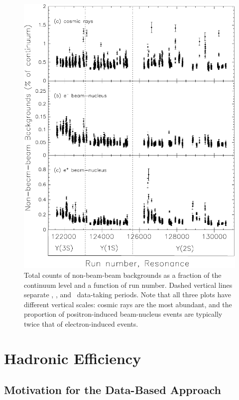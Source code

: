 \documentclass{cornell}
\begin{document}
\begin{figure}[p]
  \begin{center}
    \includegraphics[width=0.9\linewidth]{plots/backgroundsvsrun}
  \end{center}
  \caption{\label{backgroundsvsrun} Total counts of non-beam-beam
  backgrounds as a fraction of the continuum level and a function of
  run number.  Dashed vertical lines separate \usss, \us, and \uss\
  data-taking periods.  Note that all three plots have different
  vertical scales: cosmic rays are the most abundant, and the
  proportion of positron-induced beam-nucleus events are typically
  twice that of electron-induced events.}
\end{figure}

\chapter{Hadronic Efficiency}
\label{chp:efficiency}

\section{Motivation for the Data-Based Approach}
\end{document}
